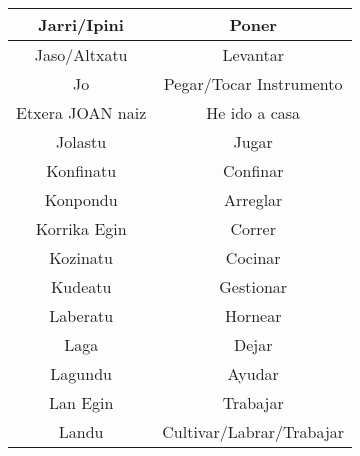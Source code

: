 \documentclass[11pt, a4paper]{article}
\begin{document}
\begin{table}[h]
\begin{tabular}{cc}
		                      Jarri/Ipini                        &                             Poner                              \\ \hline
		                      Jaso/Altxatu                       &                            Levantar                            \\ \hline
		                           Jo                            &                    Pegar/Tocar Instrumento                     \\ \hline
		                    Etxera JOAN naiz                     &                         He ido a casa                          \\ \hline
		                        Jolastu                          &                             Jugar                              \\ \hline
		                       Konfinatu                         &                            Confinar                            \\ \hline
		                        Konpondu                         &                            Arreglar                            \\ \hline
		                      Korrika Egin                       &                             Correr                             \\ \hline
		                        Kozinatu                         &                            Cocinar                             \\ \hline
		                        Kudeatu                          &                           Gestionar                            \\ \hline
		                        Laberatu                         &                            Hornear                             \\ \hline
		                          Laga                           &                             Dejar                              \\ \hline
		                        Lagundu                          &                             Ayudar                             \\ \hline
		                        Lan Egin                         &                            Trabajar                            \\ \hline
		                         Landu                           &                    Cultivar/Labrar/Trabajar                    \\ \hline

\end{tabular}
\end{table}
\end{document}
